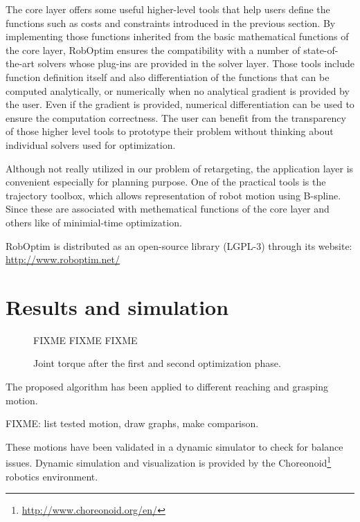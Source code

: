 \documentclass[letterpaper, 10 pt, conference]{ieeeconf}  %
\begin{document}
The core layer offers some useful higher-level tools that help users
define the functions such as costs and constraints introduced in the
previous section.  
By implementing those functions inherited from the basic
mathematical functions of the core layer,  RobOptim ensures the
compatibility with a number of state-of-the-art solvers whose plug-ins
are provided in the solver layer.
Those tools include function definition itself and also
differentiation of the functions that can be computed analytically, or numerically 
when no analytical gradient is provided by the user. Even if the
gradient is provided, numerical differentiation can be used to ensure
the computation correctness.
The user can benefit from the transparency of those higher level
tools to prototype their problem
without thinking about individual solvers used for optimization.

Although not really utilized in our problem of retargeting, the
application layer is convenient especially for planning purpose.
One of the practical tools is the trajectory toolbox,
which allows representation of robot motion using B-spline. Since
these are associated with methematical functions of the core layer and
others like of minimial-time optimization.


RobOptim is distributed as an open-source library (\mbox{LGPL-3}) through its
website: \url{http://www.roboptim.net/}



\section{Results and simulation}
\label{sec:results}


\begin{figure}[htbp!]
  FIXME FIXME FIXME
  \caption{Joint torque after the first and second optimization
    phase.}
  \label{fig:results-torque}
\end{figure}



The proposed algorithm has been applied to different reaching and
grasping motion.


FIXME: list tested motion, draw graphs, make comparison.


These motions have been validated in a dynamic simulator to check for
balance issues. Dynamic simulation and visualization is provided by
the Choreonoid\footnote{\url{http://www.choreonoid.org/en/}} robotics
environment.
\end{document}
